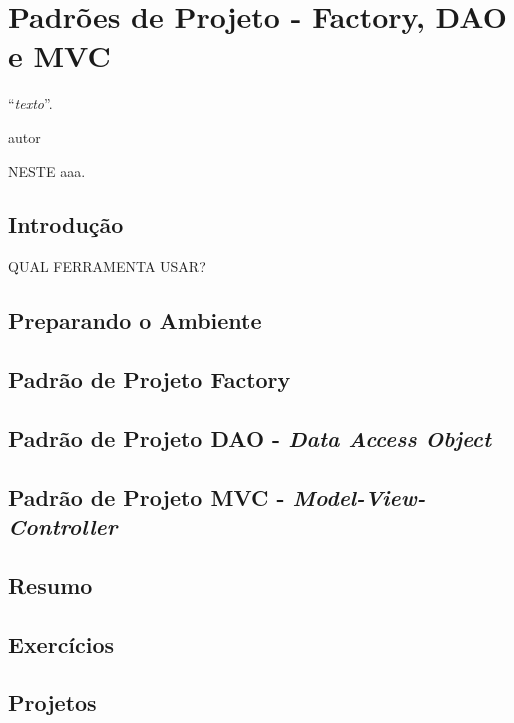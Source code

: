 \chapter{Padrões de Projeto - Factory, DAO e MVC}
\epigraph{``\textit{texto}''.}{autor}

\lettrine[lines=4, lhang=0.1, lraise=0, loversize=0.2, findent=0.1em]{\textcolor{corAzulTema}{N}}{ESTE} aaa.

\section{Introdução}

QUAL FERRAMENTA USAR?

\section{Preparando o Ambiente}

\section{Padrão de Projeto Factory}

\section{Padrão de Projeto DAO - \textit{Data Access Object}}

\section{Padrão de Projeto MVC - \textit{Model-View-Controller}}

\section{Resumo}

\section{Exercícios}

\section{Projetos}
